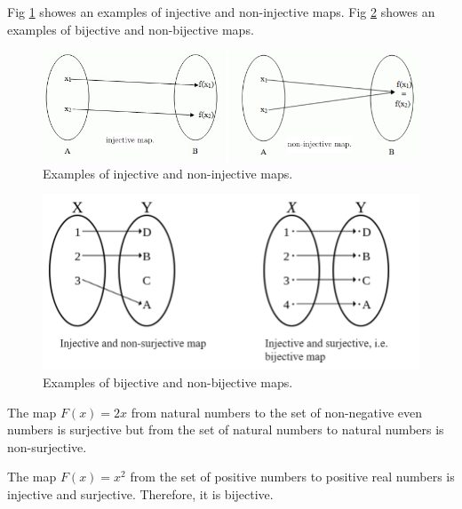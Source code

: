 \documentclass[12pt]{book}
\begin{document}
\begin{examp}\label{exp:Specialmaps3}
      Fig \ref{fig:injct} showes an examples of injective and non-injective maps. 
	  Fig \ref{fig:bijct} showes an examples of bijective and non-bijective maps.
	  \begin{figure}
      \begin{center}
      \includegraphics[scale =0.8]{p11.png}
      \caption{Examples of injective and non-injective maps.}
	  \label{fig:injct}
      \end{center}
      \end{figure}
	  \begin{figure}
      \begin{center}
      \includegraphics[scale =0.8]{p5.png}
      \caption{Examples of bijective and non-bijective maps.}
	  \label{fig:bijct}
      \end{center}
      \end{figure}
\end{examp}

\begin{examp}\label{exp:Specialmaps4}
      The map $F(x) = 2 x $ from natural numbers to the set of non-negative even numbers is surjective but from the set of natural numbers 
	  to natural numbers is non-surjective.
\end{examp}
\begin{examp}\label{exp:Specialmaps5}
      The map $F(x) = x^2$ from the set of positive numbers to positive real numbers is injective and surjective. Therefore, it is bijective.
\end{examp}
\end{document}
